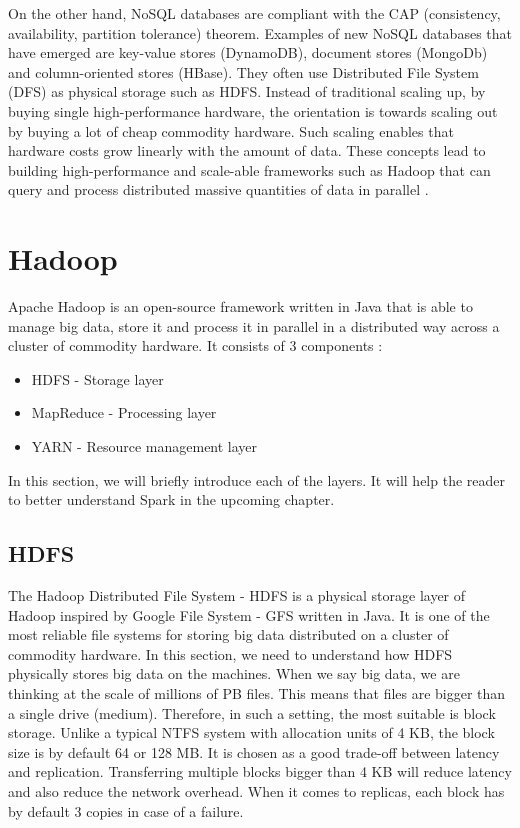 On the other hand, NoSQL databases are compliant with the CAP (consistency, availability, partition tolerance) theorem.  Examples of new NoSQL databases that have emerged are key-value stores (DynamoDB), document stores (MongoDb) and column-oriented stores (HBase). They often use Distributed File System (DFS) as physical storage such as HDFS. Instead of traditional scaling up, by buying single high-performance hardware, the orientation is towards scaling out by buying a lot of cheap commodity hardware. Such scaling enables that hardware costs grow linearly with the amount of data.  These concepts lead to building high-performance and scale-able frameworks such as Hadoop that can query and process distributed massive quantities of data in parallel \cite{BigDataCourse}. %

\section{Hadoop}
Apache Hadoop \cite{Hadoop} is an open-source framework written in Java that is able to manage big data, store it and process it in parallel in a distributed way across a cluster of commodity hardware. It consists of 3 components \cite{BigDataCourse}: %
\begin{itemize}
	\item HDFS - Storage layer
	\item MapReduce - Processing layer
	\item YARN - Resource management layer
\end{itemize}

In this section, we will briefly introduce each of the layers. It will help the reader to better understand Spark in the upcoming chapter.

\subsection{HDFS}
The Hadoop Distributed File System - HDFS \cite{HDFS} is a physical storage layer of Hadoop inspired by Google File System - GFS \cite{GFS} written in Java. It is one of the most reliable file systems for storing big data distributed on a cluster of commodity hardware. In this section, we need to understand how HDFS physically stores big data on the machines. When we say big data, we are thinking at the scale of millions of PB files. This means that files are bigger than a single drive (medium). Therefore, in such a setting, the most suitable is block storage. Unlike a typical NTFS system with allocation units of 4 KB, the block size is by default 64 or 128 MB. It is chosen as a good trade-off between latency and replication. Transferring multiple blocks bigger than 4 KB will reduce latency and also reduce the network overhead. When it comes to replicas, each block has by default 3 copies in case of a failure.  

